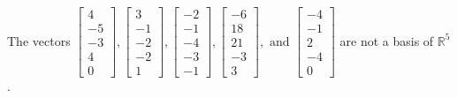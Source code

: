 \begin{exercise}
\begin{exerciseStatement}
  \end{exerciseStatement}
  \begin{exerciseAnswer}
   The vectors \(\left[\begin{array}{r}
4 \\
-5 \\
-3 \\
4 \\
0
\end{array}\right] , \left[\begin{array}{r}
3 \\
-1 \\
-2 \\
-2 \\
1
\end{array}\right] , \left[\begin{array}{r}
-2 \\
-1 \\
-4 \\
-3 \\
-1
\end{array}\right] , \left[\begin{array}{r}
-6 \\
18 \\
21 \\
-3 \\
3
\end{array}\right] , \text{ and } \left[\begin{array}{r}
-4 \\
-1 \\
2 \\
-4 \\
0
\end{array}\right]\) 
  	 are not  a basis of \(\mathbb{R}^5\).
  


  \end{exerciseAnswer}
\end{exercise}